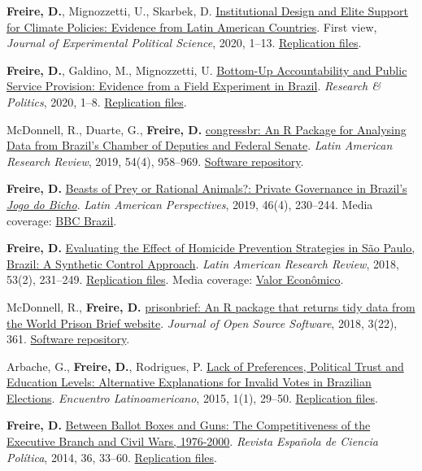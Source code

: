 \documentclass[a4paper]{article}
\renewenvironment{itemize}{
	\begin{list}{}{
			\setlength{\leftmargin}{1.5em}
		}
		}{
	\end{list}
}
\begin{document}
\begin{itemize}
\item \textbf{Freire, D.}, Mignozzetti, U., Skarbek, D. \href{http://dx.doi.org/10.1017/XPS.2020.19}{Institutional Design and Elite Support for Climate Policies: Evidence from Latin American Countries}. First view, \textit{Journal of Experimental Political Science}, 2020, 1--13. \href{https://doi.org/10.7910/DVN/VTA5OA}{Replication files}.
\item \textbf{Freire, D.}, Galdino, M., Mignozzetti, U. \href{https://doi.org/10.1177%2F2053168020914444}{Bottom-Up Accountability and Public Service Provision: Evidence from a Field Experiment in Brazil}. \textit{Research \& Politics}, 2020, 1--8. \href{https://github.com/umbertomig/tdp-accountability}{Replication files}.
\item McDonnell, R., Duarte, G., \textbf{Freire, D.} \href{https://doi.org/10.25222/larr.447}{congressbr: An R Package for Analysing Data from Brazil's Chamber of Deputies and Federal Senate}. \textit{Latin American Research Review}, 2019, 54(4), 958--969. \href{https://github.com/duarteguilherme/congressbr}{Software repository}.
\item \textbf{Freire, D.} \href{https://doi.org/10.1177/0094582X19846519}{Beasts of Prey or Rational Animals?: Private Governance in Brazil's \emph{Jogo do Bicho}}. \textit{Latin American Perspectives}, 2019, 46(4), 230--244. Media coverage: \href{http://www.bbc.com/portuguese/brasil-40140693}{BBC Brazil}.
\item \textbf{Freire, D.} \href{https://larrlasa.org/articles/10.25222/larr.334/}{Evaluating the Effect of Homicide Prevention Strategies in São Paulo, Brazil: A Synthetic Control Approach}. \textit{Latin American Research Review}, 2018, 53(2), 231--249. \href{https://github.com/danilofreire/homicides-sp-synth}{Replication files}. Media coverage: \href{http://www.valor.com.br/cultura/5111524/sangue-no-asfalto}{Valor Econômico}.
\item McDonnell, R., \textbf{Freire, D.} \href{https://doi.org/10.21105/joss.00361}{prisonbrief: An R package that returns tidy data from the World Prison Brief website}. \textit{Journal of Open Source Software}, 2018, 3(22), 361. \href{https://github.com/danilofreire/prisonbrief}{Software repository}.
\item Arbache, G., \textbf{Freire, D.}, Rodrigues, P. \href{http://www.iapss.org/wp-content/uploads/2014/10/ELA1.1_2.Lack-of-Preferences-Political-Trust-and-Education-Levels.pdf}{Lack of Preferences, Political Trust and Education Levels: Alternative Explanations for Invalid Votes in Brazilian Elections}. \textit{Encuentro Latinoamericano}, 2015, 1(1), 29--50. \href{https://github.com/danilofreire/invalid-votes-brazil}{Replication files}.
\item \textbf{Freire, D.} \href{http://recyt.fecyt.es/index.php/recp/article/view/37638}{Between Ballot Boxes and Guns: The Competitiveness of the Executive Branch and Civil Wars, 1976-2000}. \textit{Revista Española de Ciencia Política}, 2014, 36, 33--60. \href{https://doi.org/10.7910/DVN/NSDUYG}{Replication files}.
\end{itemize}
\end{document}

